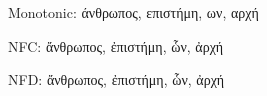 \documentclass[11pt]{article}
\begin{document}
Monotonic: άνθρωπος, επιστήμη, ων, αρχή

NFC: ἄνθρωπος, ἐπιστήμη, ὧν, ἀρχή

NFD: ἄνθρωπος, ἐπιστήμη, ὧν, ἀρχή
\end{document}
